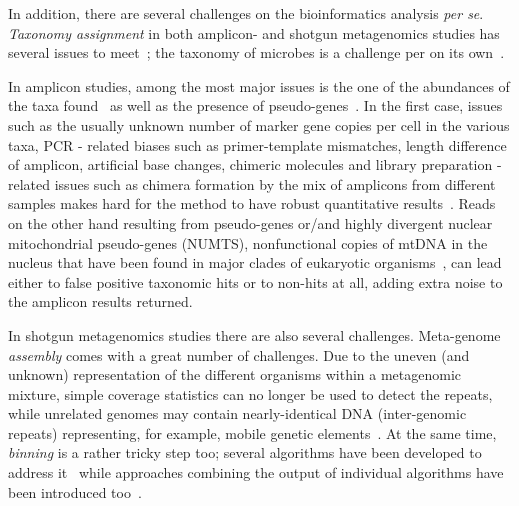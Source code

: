       In addition, there are several challenges on the bioinformatics analysis \textit{per se}.
      \textit{Taxonomy assignment} in both amplicon- and shotgun metagenomics studies 
      has several issues to meet~\cite{simon2019benchmarking};
      the taxonomy of microbes is a challenge per on its own~\cite{parks2020complete}.

      In amplicon studies, among the most major issues is the one of the abundances of the
      taxa found~\cite{fonseca2018pitfalls, balint2016millions} as well as the presence of pseudo-genes~\cite{song2008many}.
      In the first case, 
      issues such as  
      the usually unknown number of marker gene copies per cell in the various taxa,
      PCR - related biases such as primer-template mismatches, length difference of amplicon, artificial base changes, chimeric molecules 
      and library preparation - related issues such as chimera formation by the mix of amplicons from different samples
      makes hard for the method to have robust quantitative results~\cite{balint2016millions}. 
      Reads on the other hand resulting from pseudo-genes or/and highly divergent nuclear mitochondrial pseudo-genes (NUMTS), nonfunctional copies of mtDNA in the nucleus that have been found in major clades of eukaryotic organisms~\cite{bensasson2001mitochondrial}, 
      can lead either to false positive taxonomic hits or to non-hits at all,
      adding extra noise to the amplicon results returned.

      In shotgun metagenomics studies there are also several challenges. 
      Meta-genome \textit{assembly} comes with a great number of challenges. 
      Due to the uneven (and unknown) representation of the different organisms within a metagenomic mixture, simple coverage statistics can no longer be used to detect the repeats, while unrelated genomes may contain
      nearly-identical DNA (inter-genomic repeats) representing, for example, mobile genetic elements~\cite{ghurye2016focus}.
      At the same time, \textit{binning} is a rather tricky step too; 
      several algorithms have been developed to address it~\cite{yue2020evaluating}
      while approaches combining the output of individual algorithms have been introduced too~\cite{song2017binning_refiner}.


